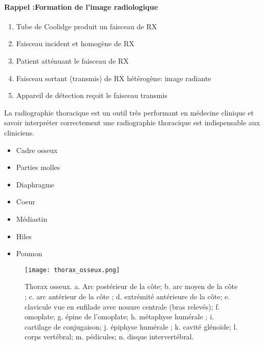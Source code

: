             \paragraph*{Rappel :Formation de l’image radiologique}
            \begin{enumerate}
                \item Tube de Coolidge produit un faisceau de RX
                \item Faisceau incident et homogène de RX
                \item Patient atténuant le faisceau de RX
                \item Faisceau sortant (transmis) de RX hétérogène: image radiante
                \item Appareil de détection reçoit le faisceau transmis
            \end{enumerate}
            La radiographie thoracique est un outil très performant en médecine clinique et savoir interpréter correctement une radiographie thoracique est indispensable aux cliniciens.
            \begin{multicols}{2}
                \begin{itemize}[label=$\bullet$]
                    \item Cadre osseux
                    \item Parties molles
                    \item Diaphragme
                    \item Coeur
                    \item Médiastin
                    \item Hiles
                    \item Poumon
                \end{itemize}
            \end{multicols}
            \begin{figure}[h]
                \centering
                \texttt{[image: thorax\_osseux.png]}
                \caption{Thorax osseux. a. Arc postérieur de la côte; b. arc moyen de la côte ; c. arc antérieur de la côte ; d. extrémité antérieure de la côte; e. clavicule vue en enfilade avec nouure centrale (bras relevés); f. omoplate; g. épine de l'omoplate; h. métaphyse humérale ; i. cartilage de conjugaison; j. épiphyse humérale ; k. cavité glénoïde; l. corps vertébral; m. pédicules; n. disque intervertébral.
                }\label{fig:thorax}
            \end{figure}
           
